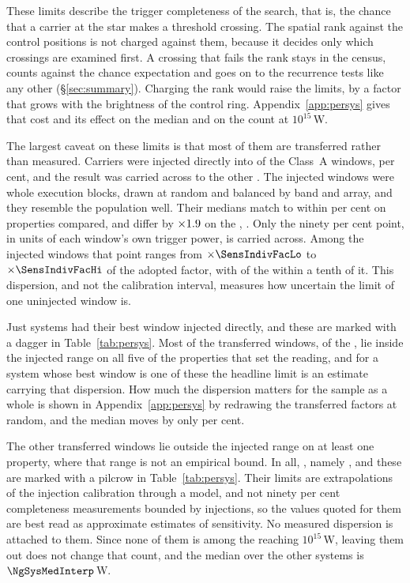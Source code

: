 These limits describe the trigger completeness of the search, that is, the
chance that a carrier at the star makes a threshold crossing. The spatial
rank against the \NCtrl{} control positions is not charged against them,
because it decides only which crossings are examined first. A crossing that
fails the rank stays in the census, counts against the chance expectation
and goes on to the recurrence tests like any other (\S\ref{sec:summary}).
Charging the rank would raise the limits, by a factor that grows with the
brightness of the control ring. Appendix~\ref{app:persys} gives that cost
and its effect on the median and on the count at $10^{15}$\,W.

The largest caveat on these limits is that most of them are transferred
rather than measured. Carriers were injected directly into \SensNInj{} of
the \NWinA{} Class~A windows, \SensNInjPct{} per cent, and the result was
carried across to the other \SensNTransfer. The injected windows were whole
execution blocks, drawn at random and balanced by band and array, and they
resemble the population well. Their medians match to within
\RpCovOtherPct{} per cent on \RpCovOtherOf{} properties compared, and
differ by $\times1.9$ on the \RpCovWorstOrd, \RpCovWorstAxis.
Only the ninety per cent point, in units of each
window's own trigger power, is carried across. Among the injected windows
that point ranges from $\times\SensIndivFacLo$ to $\times\SensIndivFacHi$ of
the adopted factor, with \NmDispNTenth{} of the \SensNInj{} within a tenth of
it. This dispersion, and not the calibration interval, measures how
uncertain the limit of one uninjected window is.

Just \SmcNMeasSys{} systems had their best window injected directly, and
these are marked with a dagger in Table~\ref{tab:persys}. Most of the transferred windows,
\NgNInterpWin{} of the \SensNTransfer, lie inside the injected range on all
five of the properties that set the reading, and for a system whose best
window is one of these the headline limit is an estimate carrying that
dispersion. How much the dispersion matters for the sample as a whole is
shown in Appendix~\ref{app:persys} by redrawing the transferred factors at
random, and the median moves by only \SvRsMedShiftPct{} per cent.

The other \NgNExtrapWin{} transferred windows lie outside the injected range
on at least one property, where that range is not an empirical bound. In
all, \NgExtrapTakeClause, namely \NgExtrapSys, and these are marked with a
pilcrow in Table~\ref{tab:persys}. Their limits are extrapolations of the
injection calibration through a model, and not ninety per cent completeness
measurements bounded by injections, so the values quoted for them are best
read as approximate estimates of sensitivity. No measured dispersion is
attached to them. Since none of them is among the \NSysEfifteen{} reaching
$10^{15}$\,W, leaving them out does not change that count, and the median
over the other \NgNSysInterpSum{} systems is $\NgSysMedInterp$\,W.

